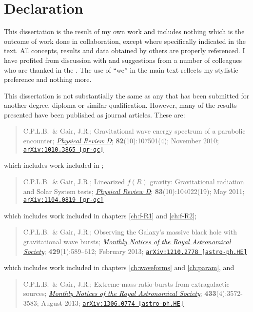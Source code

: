 \chapter*{Declaration}

This dissertation is the result of my own work and includes nothing which is the outcome of work done in collaboration, except where specifically indicated in the text. All concepts, results and data obtained by others are properly referenced. I have profited from discussion with and suggestions from a number of colleagues who are thanked in the . The use of ``we'' in the main text reflects my stylistic preference and nothing more.

This dissertation is not substantially the same as any that has been submitted for another degree, diploma or similar qualification. However, many of the results presented have been published as journal articles. These are:
\begin{quote}
C.P.L.B.\ \& Gair, J.R.; Gravitational wave energy spectrum of a parabolic encounter; \href{http://dx.doi.org/10.1103/PhysRevD.82.107501}{\it Physical Review D}; {\bf 82}(10):107501(4); November 2010; \linebreak \href{http://arxiv.org/abs/1010.3865}{\tt arXiv:1010.3865 [gr-qc]}
\end{quote}
which includes work included in ;
\begin{quote}
C.P.L.B.\ \& Gair, J.R.; Linearized $f(R)$ gravity: Gravitational radiation and Solar System tests; \href{http://dx.doi.org/10.1103/PhysRevD.83.104022}{\it Physical Review D}; {\bf 83}(10):104022(19); May 2011; \href{http://arxiv.org/abs/1104.0819}{\tt arXiv:1104.0819 [gr-qc]}
\end{quote}
which includes work included in chapters \ref{ch:f-R1} and \ref{ch:f-R2};
\begin{quote}
C.P.L.B.\ \& Gair, J.R.; Observing the Galaxy's massive black hole with gravitational wave bursts; \href{http://dx.doi.org/10.1093/mnras/sts360}{\it Monthly Notices of the Royal Astronomical Society}; {\bf 429}(1):589--612; February 2013; \href{http://arxiv.org/abs/1210.2778}{\tt arXiv:1210.2778 [astro-ph.HE]}
\end{quote}
which includes work included in chapters \ref{ch:waveforms} and \ref{ch:param}, and
\begin{quote}
C.P.L.B.\ \& Gair, J.R.; Extreme-mass-ratio-bursts from extragalactic sources; \href{http://dx.doi.org/10.1093/mnras/stt990}{\it Monthly Notices of the Royal Astronomical Society}; {\bf 433}(4):3572-3583; August 2013; \href{http://arxiv.org/abs/1210.2778}{\tt arXiv:1306.0774 [astro-ph.HE]}
\end{quote}
